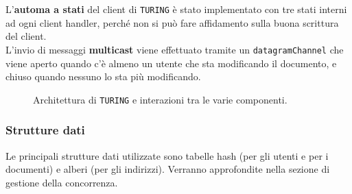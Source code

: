 L'\textbf{automa a stati} del client di \texttt{TURING} è stato implementato con tre stati interni ad ogni client handler, perché non si può fare affidamento sulla buona scrittura del client.
\medskip \\
L'invio di messaggi \textbf{multicast} viene effettuato tramite un \texttt{datagramChannel} che viene aperto quando c'è almeno un utente che sta modificando il documento, e chiuso quando nessuno lo sta più modificando.

\newpage

\begin{center}
	\begin{figure}[ht!]
		\caption{Architettura di \texttt{TURING} e interazioni tra le varie componenti.}
	\end{figure}
\end{center}

\subsubsection{Strutture dati}
Le principali strutture dati utilizzate sono tabelle hash (per gli utenti e per i documenti) e alberi (per gli indirizzi). Verranno approfondite nella sezione di gestione della concorrenza.

